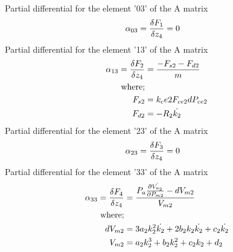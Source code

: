 \documentclass[11pt,a4paper]{article}
\begin{document}
\begin{appendices}
Partial differential for the element '03' of the A matrix\newline
\begin{align}
    \alpha_{03} = \fdv{F_1}{z_4} &= 0
\end{align}
Partial differential for the element '13' of the A matrix\newline
\begin{align}
    \alpha_{13} = \fdv{F_2}{z_4} &= \frac{-F_{s2} - F_{d2}}{m}
    \label{math:alpha_13_matrix}\\
    \text{where;}\nonumber\\
    F_{s2} &= k_ce2 F_{ce2} dP_{ce2}\nonumber\\
    F_{d2} &= -R_2 \dot{k_{2}}\nonumber
\end{align}
Partial differential for the element '23' of the A matrix\newline
\begin{align}
    \alpha_{23} = \fdv{F_3}{z_4} &= 0
\end{align}
Partial differential for the element '33' of the A matrix\newline
\begin{align}
    \alpha_{33} = \fdv{F_4}{z_4} &= \frac{P_a \frac{\partial \dot{V_{a_2}}}{\partial P_{m2}} - dV_{m2}}{V_{m2}}
    \label{math:alpha_33_matrix}\\
    \text{where;}\nonumber\\
    dV_{m2} &= 3 a_2 k_{2}^2 \dot{k_{2}} + 2 b_2 k_{2} \dot{k_{2}} + c_2 \dot{k_{2}} \nonumber\\
    V_{m2}    &= a_2 k_{2}^3 + b_2 k_{2}^2 + c_2 k_{2} + d_2\nonumber
\end{align}


\end{appendices}
\end{document}
